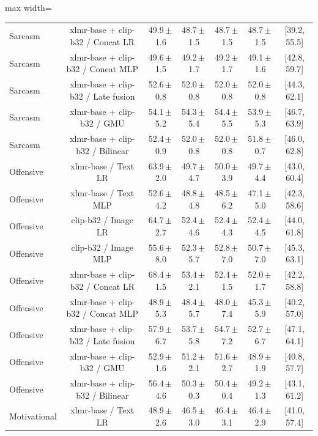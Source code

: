 \begin{table}[t]
\begin{adjustbox}{max width=\textwidth}
\begin{tabular}{lcccccc}
Sarcasm & xlmr-base + clip-b32 / Concat LR & 49.9\,$\pm$\,1.6 & 48.7\,$\pm$\,1.5 & 48.7\,$\pm$\,1.5 & 48.7\,$\pm$\,1.5 & [39.2, 55.5] \\
Sarcasm & xlmr-base + clip-b32 / Concat MLP & 49.6\,$\pm$\,1.5 & 49.2\,$\pm$\,1.7 & 49.2\,$\pm$\,1.7 & 49.1\,$\pm$\,1.6 & [42.8, 59.7] \\
Sarcasm & xlmr-base + clip-b32 / Late fusion & 52.6\,$\pm$\,0.8 & 52.0\,$\pm$\,0.8 & 52.0\,$\pm$\,0.8 & 52.0\,$\pm$\,0.8 & [44.3, 62.1] \\
Sarcasm & xlmr-base + clip-b32 / GMU & 54.1\,$\pm$\,5.2 & 54.3\,$\pm$\,5.4 & 54.4\,$\pm$\,5.5 & 53.9\,$\pm$\,5.3 & [46.7, 63.9] \\
Sarcasm & xlmr-base + clip-b32 / Bilinear & 52.4\,$\pm$\,0.9 & 52.0\,$\pm$\,0.8 & 52.0\,$\pm$\,0.8 & 51.8\,$\pm$\,0.7 & [46.0, 62.8] \\
Offensive & xlmr-base / Text LR & 63.9\,$\pm$\,2.0 & 49.7\,$\pm$\,4.7 & 50.0\,$\pm$\,3.9 & 49.7\,$\pm$\,4.4 & [43.0, 60.4] \\
Offensive & xlmr-base / Text MLP & 52.6\,$\pm$\,4.2 & 48.8\,$\pm$\,4.8 & 48.5\,$\pm$\,6.2 & 47.1\,$\pm$\,5.0 & [42.3, 58.6] \\
Offensive & clip-b32 / Image LR & 64.7\,$\pm$\,2.7 & 52.4\,$\pm$\,4.6 & 52.4\,$\pm$\,4.3 & 52.4\,$\pm$\,4.5 & [44.0, 61.8] \\
Offensive & clip-b32 / Image MLP & 55.6\,$\pm$\,8.0 & 52.3\,$\pm$\,5.7 & 52.8\,$\pm$\,7.0 & 50.7\,$\pm$\,7.0 & [45.3, 63.1] \\
Offensive & xlmr-base + clip-b32 / Concat LR & 68.4\,$\pm$\,1.5 & 53.4\,$\pm$\,2.1 & 52.4\,$\pm$\,1.5 & 52.0\,$\pm$\,1.7 & [42.2, 58.8] \\
Offensive & xlmr-base + clip-b32 / Concat MLP & 48.9\,$\pm$\,5.3 & 48.4\,$\pm$\,5.7 & 48.0\,$\pm$\,7.4 & 45.3\,$\pm$\,5.9 & [40.2, 57.0] \\
Offensive & xlmr-base + clip-b32 / Late fusion & 57.9\,$\pm$\,6.7 & 53.7\,$\pm$\,5.8 & 54.7\,$\pm$\,7.2 & 52.7\,$\pm$\,6.7 & [47.1, 64.1] \\
Offensive & xlmr-base + clip-b32 / GMU & 52.9\,$\pm$\,1.6 & 51.2\,$\pm$\,2.1 & 51.6\,$\pm$\,2.7 & 48.9\,$\pm$\,1.9 & [40.8, 57.7] \\
Offensive & xlmr-base + clip-b32 / Bilinear & 56.4\,$\pm$\,4.6 & 50.3\,$\pm$\,0.3 & 50.4\,$\pm$\,0.4 & 49.2\,$\pm$\,1.3 & [43.1, 61.2] \\
Motivational & xlmr-base / Text LR & 48.9\,$\pm$\,2.6 & 46.5\,$\pm$\,3.0 & 46.4\,$\pm$\,3.1 & 46.4\,$\pm$\,2.9 & [41.0, 57.4] \\

\end{tabular}
\end{adjustbox}
\end{table}
